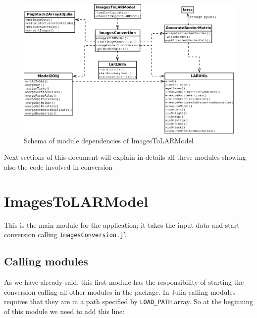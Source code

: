 \documentclass[11pt,oneside]{article}	%
\begin{document}
\begin{figure}[htb]
  \begin{center}
    \includegraphics[width=16cm]{images/architecture.png}
  \end{center}
  \caption{Schema of module dependencies of ImagesToLARModel}
  \label{fig:architecture}
\end{figure}


Next sections of this document will explain in details all these modules showing also the code involved in conversion


\section{ImagesToLARModel}\label{sec:ImagesToLARModel}

This is the main module for the application; it takes the input data and start conversion calling \texttt{ImagesConversion.jl}.

\subsection{Calling modules}\label{sec:modules}

As we have already said, this first module has the responsibility of starting the conversion calling all other modules in the package. In Julia calling modules requires that they are in a path specified by \texttt{LOAD\_PATH} array.
So at the beginning of this module we need to add this line:
\end{document}
